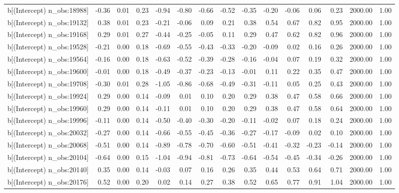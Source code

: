 \begin{table}[ht]
\begin{tabular}{rrrrrrrrrrrrrrr}
  b[(Intercept) n\_obs:18988] & -0.36 & 0.01 & 0.23 & -0.94 & -0.80 & -0.66 & -0.52 & -0.35 & -0.20 & -0.06 & 0.06 & 0.23 & 2000.00 & 1.00 \\ 
  b[(Intercept) n\_obs:19132] & 0.38 & 0.01 & 0.23 & -0.21 & -0.06 & 0.09 & 0.21 & 0.38 & 0.54 & 0.67 & 0.82 & 0.95 & 2000.00 & 1.00 \\ 
  b[(Intercept) n\_obs:19168] & 0.29 & 0.01 & 0.27 & -0.44 & -0.25 & -0.05 & 0.11 & 0.29 & 0.47 & 0.62 & 0.82 & 0.96 & 2000.00 & 1.00 \\ 
  b[(Intercept) n\_obs:19528] & -0.21 & 0.00 & 0.18 & -0.69 & -0.55 & -0.43 & -0.33 & -0.20 & -0.09 & 0.02 & 0.16 & 0.26 & 2000.00 & 1.00 \\ 
  b[(Intercept) n\_obs:19564] & -0.16 & 0.00 & 0.18 & -0.63 & -0.52 & -0.39 & -0.28 & -0.16 & -0.04 & 0.07 & 0.19 & 0.32 & 2000.00 & 1.00 \\ 
  b[(Intercept) n\_obs:19600] & -0.01 & 0.00 & 0.18 & -0.49 & -0.37 & -0.23 & -0.13 & -0.01 & 0.11 & 0.22 & 0.35 & 0.47 & 2000.00 & 1.00 \\ 
  b[(Intercept) n\_obs:19708] & -0.30 & 0.01 & 0.28 & -1.05 & -0.86 & -0.68 & -0.49 & -0.31 & -0.11 & 0.05 & 0.25 & 0.43 & 2000.00 & 1.00 \\ 
  b[(Intercept) n\_obs:19924] & 0.29 & 0.00 & 0.14 & -0.09 & 0.01 & 0.10 & 0.20 & 0.29 & 0.38 & 0.47 & 0.58 & 0.66 & 2000.00 & 1.00 \\ 
  b[(Intercept) n\_obs:19960] & 0.29 & 0.00 & 0.14 & -0.11 & 0.01 & 0.10 & 0.20 & 0.29 & 0.38 & 0.47 & 0.58 & 0.64 & 2000.00 & 1.00 \\ 
  b[(Intercept) n\_obs:19996] & -0.11 & 0.00 & 0.14 & -0.50 & -0.40 & -0.30 & -0.20 & -0.11 & -0.02 & 0.07 & 0.18 & 0.24 & 2000.00 & 1.00 \\ 
  b[(Intercept) n\_obs:20032] & -0.27 & 0.00 & 0.14 & -0.66 & -0.55 & -0.45 & -0.36 & -0.27 & -0.17 & -0.09 & 0.02 & 0.10 & 2000.00 & 1.00 \\ 
  b[(Intercept) n\_obs:20068] & -0.51 & 0.00 & 0.14 & -0.89 & -0.78 & -0.70 & -0.60 & -0.51 & -0.41 & -0.32 & -0.23 & -0.14 & 2000.00 & 1.00 \\ 
  b[(Intercept) n\_obs:20104] & -0.64 & 0.00 & 0.15 & -1.04 & -0.94 & -0.81 & -0.73 & -0.64 & -0.54 & -0.45 & -0.34 & -0.26 & 2000.00 & 1.00 \\ 
  b[(Intercept) n\_obs:20140] & 0.35 & 0.00 & 0.14 & -0.03 & 0.07 & 0.16 & 0.26 & 0.35 & 0.44 & 0.53 & 0.64 & 0.71 & 2000.00 & 1.00 \\ 
  b[(Intercept) n\_obs:20176] & 0.52 & 0.00 & 0.20 & 0.02 & 0.14 & 0.27 & 0.38 & 0.52 & 0.65 & 0.77 & 0.91 & 1.04 & 2000.00 & 1.00 \\ 

\end{tabular}
\end{table}
